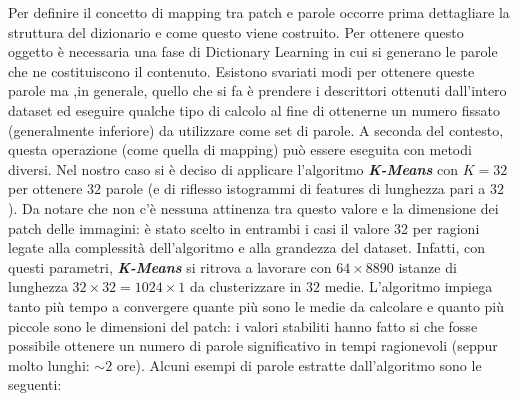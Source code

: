 \documentclass[]{report}
\begin{document}
	Per definire il concetto di mapping tra patch e parole occorre prima dettagliare la struttura del dizionario e come questo viene costruito. Per ottenere questo oggetto è necessaria una fase di Dictionary Learning in cui si generano le parole che ne costituiscono il contenuto. Esistono svariati modi per ottenere queste parole ma ,in generale, quello che si fa è prendere i descrittori ottenuti dall'intero dataset ed eseguire qualche tipo di calcolo al fine di ottenerne un numero fissato (generalmente inferiore) da utilizzare come set di parole. A seconda del contesto, questa operazione (come quella di mapping) può essere eseguita con metodi diversi. Nel nostro caso si è deciso di applicare l'algoritmo  {\bf{ \it K-Means}} con $K = 32$ per ottenere $32$ parole (e di riflesso istogrammi di features di lunghezza pari a $32$). Da notare che non c'è nessuna attinenza tra questo valore e la dimensione dei patch delle immagini: è stato scelto in entrambi i casi il valore 32 per ragioni legate alla complessità dell'algoritmo e alla grandezza del dataset. Infatti, con questi parametri, {\bf{ \it K-Means}} si ritrova a lavorare con $64\times8890$ istanze di lunghezza $32\times32 = 1024\times1$ da clusterizzare in $32$ medie. L'algoritmo impiega tanto più tempo a convergere quante più sono le medie da calcolare e quanto più piccole sono le dimensioni del patch: i valori stabiliti hanno fatto si che fosse possibile ottenere un numero di parole significativo in tempi ragionevoli (seppur molto lunghi: $\sim2$ ore). Alcuni esempi di parole estratte dall'algoritmo sono le seguenti:
\end{document}
